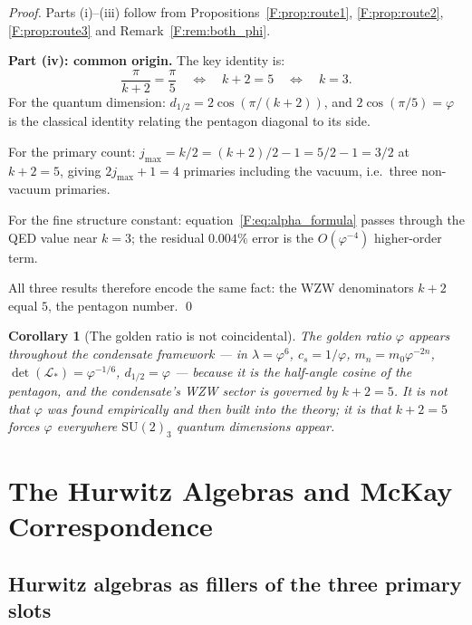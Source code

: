 \documentclass[11pt,a4paper]{article}
\newtheorem{corollary}[theorem]{Corollary}
\theoremstyle{definition}
\theoremstyle{remark}
\newcommand{\vp}{\varphi}
\newcommand{\lam}{\lambda}
\begin{document}
\begin{proof}
Parts (i)--(iii) follow from Propositions~\ref{F:prop:route1},
\ref{F:prop:route2}, \ref{F:prop:route3} and Remark~\ref{F:rem:both_phi}.

\textbf{Part (iv): common origin.}
The key identity is:
\begin{equation}
  \frac{\pi}{k+2} = \frac{\pi}{5}
  \quad\Longleftrightarrow\quad
  k+2 = 5
  \quad\Longleftrightarrow\quad
  k = 3.
  \label{F:eq:pi_over_5}
\end{equation}
For the quantum dimension: $d_{1/2} = 2\cos(\pi/(k+2))$, and
$2\cos(\pi/5) = \vp$ is the classical identity relating the pentagon
diagonal to its side.

For the primary count: $j_{\max} = k/2 = (k+2)/2 - 1 = 5/2 - 1 = 3/2$
at $k+2=5$, giving $2j_{\max}+1 = 4$ primaries including the vacuum,
i.e.\ three non-vacuum primaries.

For the fine structure constant: equation~\eqref{F:eq:alpha_formula}
passes through the QED value near $k=3$; the residual $0.004\%$ error
is the $O(\vp^{-4})$ higher-order term.

All three results therefore encode the same fact: the
WZW denominators $k+2$ equal $5$, the pentagon number.
\qed
\end{proof}

\begin{corollary}[The golden ratio is not coincidental]
\label{F:cor:phi_origin}
The golden ratio $\vp$ appears throughout the condensate framework
--- in $\lam=\vp^6$, $c_s=1/\vp$, $m_n=m_0\vp^{-2n}$,
$\det(\mathcal{L}_*)=\vp^{-1/6}$, $d_{1/2}=\vp$ ---
because it is the half-angle cosine of the pentagon,
and the condensate's WZW sector is governed by $k+2=5$.
It is not that $\vp$ was found empirically and then built into the theory;
it is that $k+2=5$ forces $\vp$ everywhere $\mathrm{SU}(2)_3$
quantum dimensions appear.
\end{corollary}

\section{The Hurwitz Algebras and McKay Correspondence}
\label{F:sec:hurwitz}

\subsection{Hurwitz algebras as fillers of the three primary slots}
\end{document}
